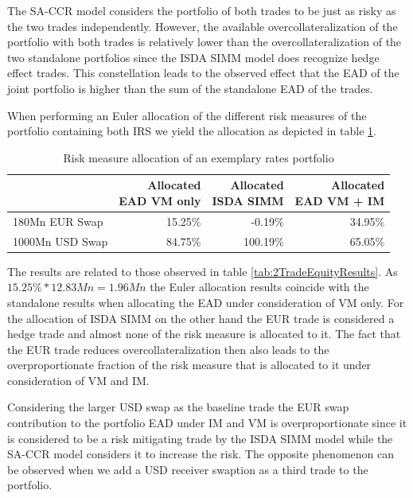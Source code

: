 \documentclass[../Thesis_AHoecherl.tex]{subfiles}
\begin{document}
    The \gls{SA-CCR} model considers the portfolio of both trades to be just as risky as the two trades independently. However, the available overcollateralization of the portfolio with both trades is relatively lower than the overcollateralization of the two standalone portfolios since the \gls{ISDA SIMM} model does recognize hedge effect trades. This constellation leads to the observed effect that the \gls{EAD} of the joint portfolio is higher than the sum of the standalone \gls{EAD} of the trades.

    When performing an Euler allocation of the different risk measures of the portfolio containing both \gls{IRS} we yield the allocation as depicted in table \ref{tab:2TradeRatesAllocation}.

    \begin{table}[htbp]
        \centering
        \begin{tabular}{l||r|r|r}
                & \makecell{Allocated \\ \gls{EAD} \gls{VM} only} & \makecell{Allocated \\ \gls{ISDA SIMM}} & \makecell{Allocated \\ \gls{EAD} \gls{VM} + IM} \\
                \toprule
        180Mn EUR Swap & 15.25\% & -0.19\% & 34.95\% \\
        1000Mn USD Swap & 84.75\% & 100.19\% & 65.05\% \\
        \end{tabular}%
        \caption{Risk measure allocation of an exemplary rates portfolio}
        \label{tab:2TradeRatesAllocation}%
    \end{table}%
    
    The results are related to those observed in table \ref{tab:2TradeEquityResults}. As $15.25\% * 12.83Mn = 1.96Mn$ the Euler allocation results coincide with the standalone results when allocating the \gls{EAD} under consideration of \gls{VM} only. 
    For the allocation of \gls{ISDA SIMM} on the other hand the EUR trade is considered a hedge trade and almost none of the risk measure is allocated to it. 
    The fact that the EUR trade reduces overcollateralization then also leads to the overproportionate fraction of the risk measure that is allocated to it under consideration of \gls{VM} and IM.
    
    Considering the larger USD swap as the baseline trade the EUR swap contribution to the portfolio \gls{EAD} under \gls{IM} and \gls{VM} is overproportionate since it is considered to be a risk mitigating trade by the \gls{ISDA SIMM} model while the \gls{SA-CCR} model considers it to increase the risk. The opposite phenomenon can be observed when we add a USD receiver swaption as a third trade to the portfolio.
\end{document}
